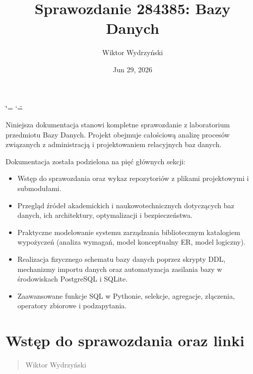 \documentclass[a4paper,11pt,english,openany,oneside]{sphinxmanual}
\title{Sprawozdanie 284385: Bazy Danych}
\date{Jun 29, 2026}
\author{Wiktor Wydrzyński}
\begin{document}
\ifdefined\shorthandoff
  \ifnum\catcode`\=\string=\active\shorthandoff{=}\fi
  \ifnum\catcode`\"=\active{}\fi
\fi

\pagestyle{empty}
\sphinxmaketitle
\pagestyle{plain}
\sphinxtableofcontents
\pagestyle{normal}
\label{\detokenize{index::doc}}


\sphinxAtStartPar
Niniejsza dokumentacja stanowi kompletne sprawozdanie z laboratorium przedmiotu Bazy Danych. Projekt obejmuje całościową analizę procesów związanych z administracją i projektowaniem relacyjnych baz danych.

\sphinxAtStartPar
Dokumentacja została podzielona na pięć głównych sekcji:
\begin{itemize}
\item {} 
\sphinxAtStartPar
{} Wstęp do sprawozdania oraz wykaz repozytoriów z plikami projektowymi i submodułami.

\item {} 
\sphinxAtStartPar
{} Przegląd źródeł akademickich i naukowo\sphinxhyphen{}technicznych dotyczących baz danych, ich architektury, optymalizacji i bezpieczeństwa.

\item {} 
\sphinxAtStartPar
{} Praktyczne modelowanie systemu zarządzania bibliotecznym katalogiem wypożyczeń (analiza wymagań, model konceptualny E\sphinxhyphen{}R, model logiczny).

\item {} 
\sphinxAtStartPar
{} Realizacja fizycznego schematu bazy danych poprzez skrypty DDL, mechanizmy importu danych oraz automatyzacja zasilania bazy w środowiskach PostgreSQL i SQLite.

\item {} 
\sphinxAtStartPar
{} Zaawansowane funkcje SQL w Pythonie, selekcje, agregacje, złączenia, operatory zbiorowe i podzapytania.

\end{itemize}

\sphinxstepscope


\chapter{Wstęp do sprawozdania oraz linki}
\label{\detokenize{rozdzial_1/index:wstep-do-sprawozdania-oraz-linki}}\label{\detokenize{rozdzial_1/index::doc}}\begin{quote}\begin{description}
\sphinxAtStartPar
Wiktor Wydrzyński

\end{description}\end{quote}
\end{document}
